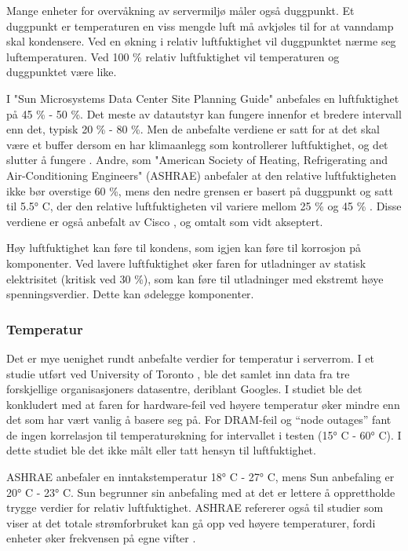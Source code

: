 Mange enheter for overvåkning av servermiljø måler også duggpunkt. Et duggpunkt er temperaturen en viss mengde luft må avkjøles til for at vanndamp skal kondensere. Ved en økning i relativ luftfuktighet vil duggpunktet nærme seg luftemperaturen. Ved 100 \% relativ luftfuktighet vil temperaturen og duggpunktet være like. 

I "Sun Microsystems Data Center Site Planning Guide" anbefales en luftfuktighet på 45 \% - 50 \%. Det meste av datautstyr kan fungere innenfor et bredere intervall enn det, typisk 20 \% - 80 \%. Men de anbefalte verdiene er satt for at det skal være et buffer dersom en har klimaanlegg som kontrollerer luftfuktighet, og det slutter å fungere \cite{planningserver}. Andre, som "American Society of Heating, Refrigerating and Air-Conditioning Engineers" (ASHRAE) anbefaler at den relative luftfuktigheten ikke bør overstige 60 \%, mens den nedre grensen er basert på duggpunkt og satt til 5.5° C, der den relative luftfuktigheten vil variere mellom 25 \% og 45 \% \cite{envguide}. Disse verdiene er også anbefalt av Cisco \cite{ciscoenvguide}, og omtalt som vidt akseptert. 

Høy luftfuktighet kan føre til kondens, som igjen kan føre til korrosjon på komponenter. Ved lavere luftfuktighet øker faren for utladninger av statisk elektrisitet (kritisk ved 30 \%), som kan føre til utladninger med ekstremt høye spenningsverdier. Dette kan ødelegge komponenter.

\subsubsection{Temperatur}
Det er mye uenighet rundt anbefalte verdier for temperatur i serverrom. I et studie utført ved University of Toronto \cite{torontopaper}, ble det samlet inn data fra tre forskjellige organisasjoners datasentre, deriblant Googles. I studiet ble det konkludert med at faren for hardware-feil ved høyere temperatur øker mindre enn det som har vært vanlig å basere seg på. For DRAM-feil og ``node outages'' fant de ingen korrelasjon til temperaturøkning for intervallet i testen (15° C - 60° C). I dette studiet ble det ikke målt eller tatt hensyn til luftfuktighet. 

ASHRAE anbefaler en inntakstemperatur 18° C - 27° C, mens Sun anbefaling er 20° C - 23° C. Sun begrunner sin anbefaling med at det er lettere å opprettholde trygge verdier for relativ luftfuktighet. ASHRAE refererer også til studier som viser at det totale strømforbruket kan gå opp ved høyere temperaturer, fordi enheter øker frekvensen på egne vifter \cite{datacentertemp}.

